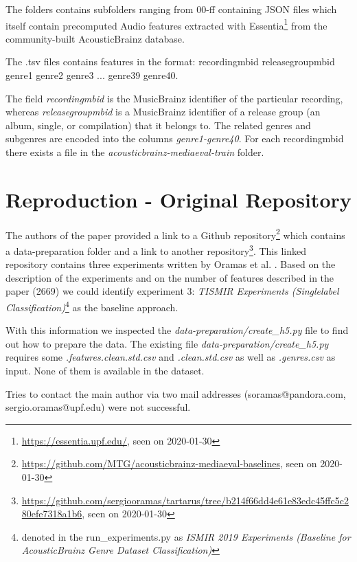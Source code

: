 \documentclass[sigconf,nonacm]{acmart}
\begin{document}
The folders contains subfolders ranging from 00-ff containing JSON files which itself contain precomputed Audio features extracted with Essentia\footnote{\url{https://essentia.upf.edu/}, seen on 2020-01-30} from the community-built AcousticBrainz database.

The .tsv files contains features in the format:
recordingmbid   releasegroupmbid        genre1  genre2  genre3  ... genre39 genre40.

The field \textit{recordingmbid} is the MusicBrainz identifier of the particular recording, whereas \textit{releasegroupmbid} is a MusicBrainz identifier of a release group (an album, single, or compilation) that it belongs to. The related genres and subgenres are encoded into the columns \textit{genre1-genre40}.
For each recordingmbid there exists a file in the \textit{acousticbrainz-mediaeval-train} folder.



\section{Reproduction - Original Repository}\label{reproduction1}

The authors of the paper provided a link to a Github repository\footnote{\url{https://github.com/MTG/acousticbrainz-mediaeval-baselines}, seen on 2020-01-30} which contains a data-preparation folder and a link to another repository\footnote{\url{https://github.com/sergiooramas/tartarus/tree/b214f66dd4e61e83edc45ffc5c280efe7318a1b6}, seen on 2020-01-30}. 
This linked repository contains three experiments written by Oramas et al. . Based on the description of the experiments and on the number of features described in the paper (2669) we could identify experiment 3: \textit{TISMIR Experiments (Single\-label Classification)}\footnote{denoted in the run\_experiments.py as \textit{ISMIR 2019 Experiments (Baseline for AcousticBrainz Genre Dataset Classification)}} as the baseline approach.

With this information we inspected the \textit{data-preparation/create\_h5.py} file to find out how to prepare the data. The existing file \textit{data-preparation/create\_h5.py} requires some \textit{.features.clean.std.csv} and \textit{.clean.std.csv} as well as \textit{.genres.csv} as input. None of them is available in the dataset.

Tries to contact the main author via two mail addresses (soramas@pandora.com, sergio.oramas@upf.edu) were not successful.
\end{document}
